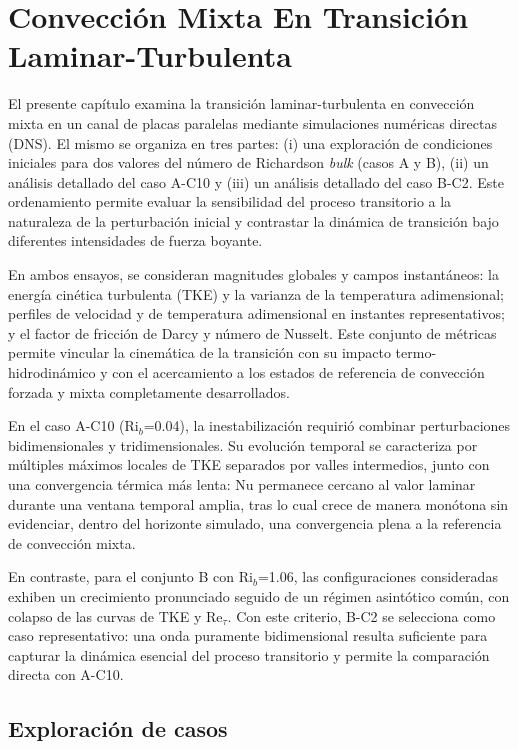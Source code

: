 \chapter{Convección Mixta En Transición Laminar-Turbulenta} \label{cap:transicion}

El presente capítulo examina la transición laminar-turbulenta en convección mixta en un canal de placas paralelas mediante simulaciones numéricas directas (DNS). El mismo se organiza en tres partes: (i) una exploración de condiciones iniciales para dos valores del número de Richardson \textit{bulk} (casos A y B), (ii) un análisis detallado del caso A-C10 y (iii) un análisis detallado del caso B-C2. Este ordenamiento permite evaluar la sensibilidad del proceso transitorio a la naturaleza de la perturbación inicial y contrastar la dinámica de transición bajo diferentes intensidades de fuerza boyante.

En ambos ensayos, se consideran magnitudes globales y campos instantáneos: la energía cinética turbulenta (TKE) y la varianza de la temperatura adimensional; perfiles de velocidad y de temperatura adimensional en instantes representativos; y el factor de fricción de Darcy y número de Nusselt. Este conjunto de métricas permite vincular la cinemática de la transición con su impacto termo-hidrodinámico y con el acercamiento a los estados de referencia de convección forzada y mixta completamente desarrollados.

En el caso A-C10 (Ri$_b$=0.04), la inestabilización requirió combinar perturbaciones bidimensionales y tridimensionales. Su evolución temporal se caracteriza por múltiples máximos locales de TKE separados por valles intermedios, junto con una convergencia térmica más lenta: Nu permanece cercano al valor laminar durante una ventana temporal amplia, tras lo cual crece de manera monótona sin evidenciar, dentro del horizonte simulado, una convergencia plena a la referencia de convección mixta.

En contraste, para el conjunto B con Ri$_b$=1.06, las configuraciones consideradas exhiben un crecimiento pronunciado seguido de un régimen asintótico común, con colapso de las curvas de TKE y Re$_{\tau}$. Con este criterio, B-C2 se selecciona como caso representativo: una onda puramente bidimensional resulta suficiente para capturar la dinámica esencial del proceso transitorio y permite la comparación directa con A-C10.

\newpage

\section{Exploración de casos}

